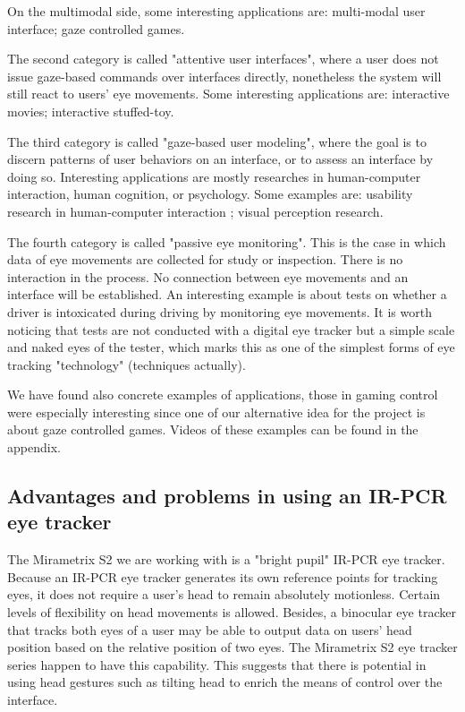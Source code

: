 \documentclass[english]{tktltiki}
\begin{document}
On the multimodal side, some interesting applications are: multi-modal user interface\cite{538404}\cite{maglio2000}; gaze controlled games\cite{Isokoski:2009:GCG:1667488.1667491}. 

The second category is called "attentive user interfaces", where a user does not issue gaze-based commands over interfaces directly, nonetheless the system will still react to users' eye movements. Some interesting applications are: interactive movies\cite{doi:10.1080/14626260500476523}; interactive stuffed-toy\cite{Yonezawa:2007:GBS:1322192.1322218}.

The third category is called "gaze-based user modeling", where the goal is to discern patterns of user behaviors on an interface, or to assess an interface by doing so. Interesting applications are mostly researches in human-computer interaction, human cognition, or psychology. Some examples are: usability research in human-computer interaction \cite{Poole05eyetracking} \cite{Jacob2003573}; visual perception research\cite{John2004}.

The fourth category is called "passive eye monitoring". This is the case in which data of eye movements are collected for study or inspection. There is no interaction in the process. No connection between eye movements and an interface will be established. An interesting example is about tests on whether a driver is intoxicated during driving by monitoring eye movements\cite{Busloff1993}. It is worth noticing that tests are not conducted with a digital eye tracker but a simple scale and naked eyes of the tester, which marks this as one of the simplest forms of eye tracking "technology" (techniques actually).

We have found also concrete examples of applications, those in gaming control were especially interesting since one of our alternative idea for the project is about gaze controlled games. Videos of these examples can be found in the appendix. 

\subsection{Advantages and problems in using an IR-PCR eye tracker}

The Mirametrix S2 we are working with is a "bright pupil" IR-PCR eye tracker. Because an IR-PCR eye tracker generates its own reference points for tracking eyes, it does not require a user's head to remain absolutely motionless. Certain levels of flexibility on head movements is allowed. Besides, a binocular eye tracker that tracks both eyes of a user may be able to output data on users' head position based on the relative position of two eyes. The Mirametrix S2 eye tracker series happen to have this capability. This suggests that there is potential in using head gestures such as tilting head to enrich the means of control over the interface. 
\end{document}

